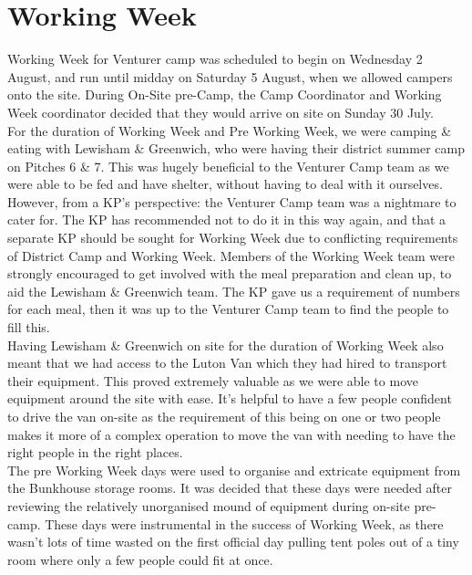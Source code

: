 \chapter{Working Week}
Working Week for Venturer camp was scheduled to begin on Wednesday 2 August, and run until midday on Saturday 5 August, when we allowed campers onto the site. During On-Site pre-Camp, the Camp Coordinator and Working Week coordinator decided that they would arrive on site on Sunday 30 July. \\

For the duration of Working Week and Pre Working Week, we were camping \& eating with Lewisham \& Greenwich, who were having their district summer camp on Pitches 6 \& 7. This was hugely beneficial to the Venturer Camp team as we were able to be fed and have shelter, without having to deal with it ourselves. However, from a KP's perspective: the Venturer Camp team was a nightmare to cater for. The KP has recommended not to do it in this way again, and that a separate KP should be sought for Working Week due to conflicting requirements of District Camp and Working Week. Members of the Working Week team were strongly encouraged to get involved with the meal preparation and clean up, to aid the Lewisham \& Greenwich team. The KP gave us a requirement of numbers for each meal, then it was up to the Venturer Camp team to find the people to fill this.\\

Having Lewisham \& Greenwich on site for the duration of Working Week also meant that we had access to the Luton Van which they had hired to transport their equipment. This proved extremely valuable as we were able to move equipment around the site with ease. It's helpful to have a few people confident to drive the van on-site as the requirement of this being on one or two people makes it more of a complex operation to move the van with needing to have the right people in the right places. \\

The pre Working Week days were used to organise and extricate equipment from the Bunkhouse storage rooms. It was decided that these days were needed after reviewing the relatively unorganised mound of equipment during on-site pre-camp. These days were instrumental in the success of Working Week, as there wasn't lots of time wasted on the first official day pulling tent poles out of a tiny room where only a few people could fit at once.\\

